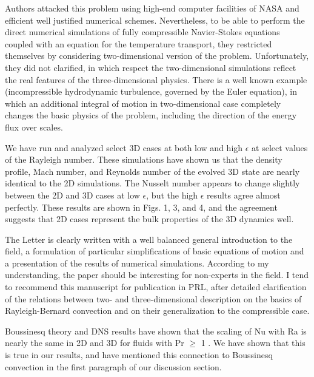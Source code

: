\documentclass[aps, 11pt, singlecolumn]{revtex4-1} %
\begin{document}
\begin{singlespace}
\begin{myquotation}
Authors attacked this problem using high-end computer facilities of
NASA and efficient well justified numerical schemes. Nevertheless, to
be able to perform the direct numerical simulations of fully
compressible Navier-Stokes equations coupled with an equation for the
temperature transport, they restricted themselves by considering
two-dimensional version of the problem. Unfortunately, they did not
clarified, in which respect the two-dimensional simulations reflect
the real features of the three-dimensional physics. There is a well
known example (incompressible hydrodynamic turbulence, governed by the
Euler equation), in which an additional integral of motion in
two-dimensional case completely changes the basic physics of the
problem, including the direction of the energy flux over scales.
\end{myquotation}

We have run and analyzed select 3D cases at both low and high $\epsilon$
at select values of the Rayleigh number.  These simulations have shown
us that the density profile, Mach number, and Reynolds number of the
evolved 3D state are nearly identical to the 2D simulations.  The Nusselt
number appears to change slightly between the 2D and 3D cases at low $\epsilon$, 
but the high $\epsilon$ results agree almost perfectly.  These results are shown
in Figs. 1, 3, and 4, and the agreement suggests that 2D cases
represent the bulk properties of the 3D dynamics well.

\begin{myquotation}
The Letter is clearly written with a well balanced general
introduction to the field, a formulation of particular simplifications
of basic equations of motion and a presentation of the results of
numerical simulations. According to my understanding, the paper should
be interesting for non-experts in the field. I tend to recommend this
manuscript for publication in PRL, after detailed clarification of the
relations between two- and three-dimensional description on the basics
of Rayleigh-Bernard convection and on their generalization to the
compressible case.
\end{myquotation}

Boussinesq theory and DNS results have shown that the scaling of Nu with Ra
is nearly the same in 2D and 3D for fluids with Pr $\geq$ 1 \cite{ahlers&all2009}.
We have shown that this is true in our results, and have mentioned this connection
to Boussinesq convection in the first paragraph of our discussion section.






\end{singlespace}
\end{document}
